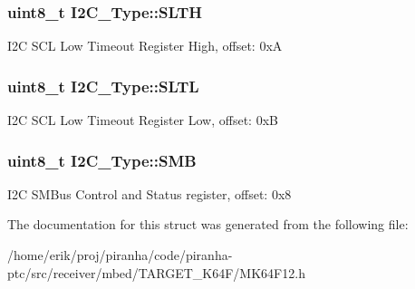 \subsubsection[{\texorpdfstring{S\+L\+TH}{SLTH}}]{ uint8\+\_\+t I2\+C\+\_\+\+Type\+::\+S\+L\+TH}\hypertarget{structI2C__Type_a4296f35ffa40f96e2695a8ab22177be6}{}\label{structI2C__Type_a4296f35ffa40f96e2695a8ab22177be6}
I2C S\+CL Low Timeout Register High, offset\+: 0xA 
\subsubsection[{\texorpdfstring{S\+L\+TL}{SLTL}}]{ uint8\+\_\+t I2\+C\+\_\+\+Type\+::\+S\+L\+TL}\hypertarget{structI2C__Type_a7e601051f907649a091973dd0ab2ea27}{}\label{structI2C__Type_a7e601051f907649a091973dd0ab2ea27}
I2C S\+CL Low Timeout Register Low, offset\+: 0xB 
\subsubsection[{\texorpdfstring{S\+MB}{SMB}}]{ uint8\+\_\+t I2\+C\+\_\+\+Type\+::\+S\+MB}\hypertarget{structI2C__Type_a148222c48ca2815cfe85c68a6cff61a7}{}\label{structI2C__Type_a148222c48ca2815cfe85c68a6cff61a7}
I2C S\+M\+Bus Control and Status register, offset\+: 0x8 

The documentation for this struct was generated from the following file\+:\begin{DoxyCompactItemize}
\item 
/home/erik/proj/piranha/code/piranha-\/ptc/src/receiver/mbed/\+T\+A\+R\+G\+E\+T\+\_\+\+K64\+F/M\+K64\+F12.\+h\end{DoxyCompactItemize}
